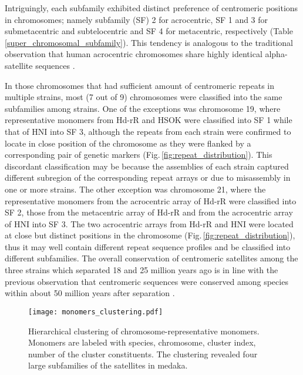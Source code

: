   Intriguingly, each subfamily exhibited distinct preference of centromeric positions in chromosomes; namely subfamily (SF) 2 for acrocentric, SF 1 and 3 for submetacentric and subtelocentric and SF 4 for metacentric, respectively (Table \ref{super_chromosomal_subfamily}). This tendency is analogous to the traditional observation that human acrocentric chromosomes share highly identical alpha-satellite sequences \cite{Willard1991}.

  In those chromosomes that had sufficient amount of centromeric repeats in multiple strains, most (7 out of 9) chromosomes were classified into the same subfamilies among strains. One of the exceptions was chromosome 19, where representative monomers from Hd-rR and HSOK were classified into SF 1 while that of HNI into SF 3, although the repeats from each strain were confirmed to locate in close position of the chromosome as they were flanked by a corresponding pair of genetic markers (Fig.\,\ref{fig:repeat_distribution}). This discordant classification may be because the assemblies of each strain captured different subregion of the corresponding repeat arrays or due to misassembly in one or more strains. The other exception was chromosome 21, where the representative monomers from the acrocentric array of Hd-rR were classified into SF 2, those from the metacentric array of Hd-rR and from the acrocentric array of HNI into SF 3. The two acrocentric arrays from Hd-rR and HNI were located at close but distinct positions in the chromosome (Fig.\,\ref{fig:repeat_distribution}), thus it may well contain different repeat sequence profiles and be classified into different subfamilies. The overall conservation of centromeric satellites among the three strains which separated 18 and 25 million years ago is in line with the previous observation that centromeric sequences were conserved among species within about 50 million years after separation \cite{Melters2013}.

  \begin{figure*}
    \centering
    \texttt{[image: monomers\_clustering.pdf]}
    \caption{
      Hierarchical clustering of chromosome-representative monomers. Monomers are labeled with species, chromosome, cluster index, number of the cluster constituents. The clustering revealed four large subfamilies of the satellites in medaka.
    }
    \label{monomer_clustering}
  \end{figure*}

